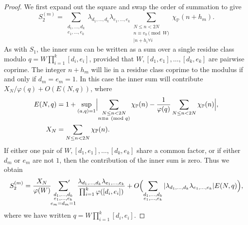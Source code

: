 \documentclass[12pt,a4paper]{amsart}
\theoremstyle{plain}
\numberwithin{sblmm}{thrm}
\numberwithin{equation}{section}
\renewcommand{\phi}{\varphi}
\begin{document}
\begin{proof}
We first expand out the square and swap the order of summation to give
\begin{equation}
S_2^{(m)}=\sum_{\substack{d_1,\dotsc,d_k\\ e_1,\dotsc,e_k}}\lambda_{d_1,\dotsc,d_k}\lambda_{e_1,\dotsc,e_k}\sum_{\substack{N\le n<2N\\ n\equiv v_0\pmod{W}\\ [d_i,e_i]|n+h_i\forall i}}\chi_\mathbb{P}(n+h_m).
\end{equation}
As with $S_1$, the inner sum can be written as a sum over a single residue class modulo $q=W\prod_{i=1}^k[d_i,e_i]$, provided that $W,[d_1,e_1],\dotsc, [d_k,e_k]$ are pairwise coprime. The integer $n+h_m$ will lie in a residue class coprime to the modulus if and only if $d_m=e_m=1$. In this case the inner sum will contribute $X_N/\phi(q)+O(E(N,q))$, where
\begin{align}
E(N,q)&=1+\sup_{(a,q)=1}\Bigl|\sum_{\substack{N\le n<2N\\ n\equiv a \pmod{q}}}\chi_{\mathbb{P}}(n)-\frac{1}{\phi(q)}\sum_{N\le n<2N}\chi_\mathbb{P}(n)\Bigr|,\\
X_N&=\sum_{N\le n<2N}\chi_{\mathbb{P}}(n).\end{align}
If either one pair of $W, [d_1,e_1],\dotsc, [d_k,e_k]$ share a common factor, or if either $d_m$ or $e_m$ are not $1$, then the contribution of the inner sum is zero. Thus we obtain
\begin{equation}
S_2^{(m)}=\frac{X_N}{\phi(W)}\sideset{}{'}\sum_{\substack{d_1,\dotsc,d_k\\e_1,\dotsc,e_k\\ e_m=d_m=1}}\frac{\lambda_{d_1,\dotsc,d_k}\lambda_{e_1,\dotsc,e_k}}{\prod_{i=1}^k\phi([d_i,e_i])}+O\Bigl(\sum_{\substack{d_1,\dotsc,d_k\\ e_1,\dotsc,e_k}}|\lambda_{d_1,\dotsc,d_k}\lambda_{e_1,\dotsc,e_k}|E(N,q)\Bigr),
\end{equation}
where we have written $q=W\prod_{i=1}^k[d_i,e_i]$.


\end{proof}
\end{document}
